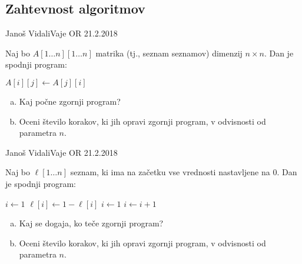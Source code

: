 \subsection{Zahtevnost algoritmov}

\begin{naloga}{Janoš Vidali}{Vaje OR 21.2.2018}
\begin{vprasanje}
Naj bo $A[1 \dots n][1 \dots n]$ matrika (tj., seznam seznamov)
dimenzij $n \times n$.
Dan je spodnji program:
\begin{small}
\begin{algorithmic}
        \State $A[i][j] \gets A[j][i]$
    \EndFor
\EndFor
\end{algorithmic}
\end{small}


\begin{enumerate}[(a)]
\item Kaj počne zgornji program?
\item Oceni število korakov, ki jih opravi zgornji program,
v odvisnosti od parametra $n$.
\end{enumerate}
\end{vprasanje}
\begin{odgovor}
\end{odgovor}
\end{naloga}


\begin{naloga}{Janoš Vidali}{Vaje OR 21.2.2018}
\begin{vprasanje}
Naj bo $\ell[1 \dots n]$ seznam,
ki ima na začetku vse vrednosti nastavljene na $0$.
Dan je spodnji program:

\begin{small}
\begin{algorithmic}
\State $i \gets 1$
    \State $\ell[i] \gets 1 - \ell[i]$
        \State $i \gets 1$
    \Else
        \State $i \gets i+1$
    \EndIf
\EndWhile
\end{algorithmic}
\end{small}

\begin{enumerate}[(a)]
\item Kaj se dogaja, ko teče zgornji program?
\item Oceni število korakov, ki jih opravi zgornji program,
v odvisnosti od parametra $n$.
\end{enumerate}

\end{vprasanje}
\begin{odgovor}
\end{odgovor}
\end{naloga}


